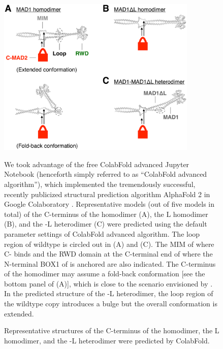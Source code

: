 \begin{figure}
    \centering
    \includegraphics[width=0.85\textwidth]{chapters/figures/ColabFoldPrediction.pdf}
    \caption{Representative structures of the C-terminus of the  homodimer, the \textDelta{}L homodimer, and the -\textDelta{}L heterodimer were predicted by ColabFold.}
    \noindent\justifying We took advantage of the free ColabFold advanced Jupyter Notebook (henceforth simply referred to as ``ColabFold advanced algorithm''), which implemented the tremendously successful, recently publicized structural prediction algorithm AlphaFold 2 in Google Colaboratory \cite{ColabFold, AlphaFold}. Representative models (out of five models in total) of the C-terminus of the  homodimer (A), the \textDelta{}L homodimer (B), and the -\textDelta{}L heterodimer (C) were predicted using the default parameter settings of ColabFold advanced algorithm. The loop region of wildtype  is circled out in (A) and (C). The MIM of  where C- binds and the RWD domain at the C-terminal end of  where the N-terminal BOX1 of  is anchored are also indicated. The C-terminus of the  homodimer may assume a fold-back conformation [see the bottom panel of (A)], which is close to the scenario envisioned by \cite{SpMad1}. In the predicted structure of the -\textDelta{}L heterodimer, the loop region of the wildtype copy introduces a bulge but the overall conformation is extended. 
    \label{ColabFoldPrediction}
\end{figure}

